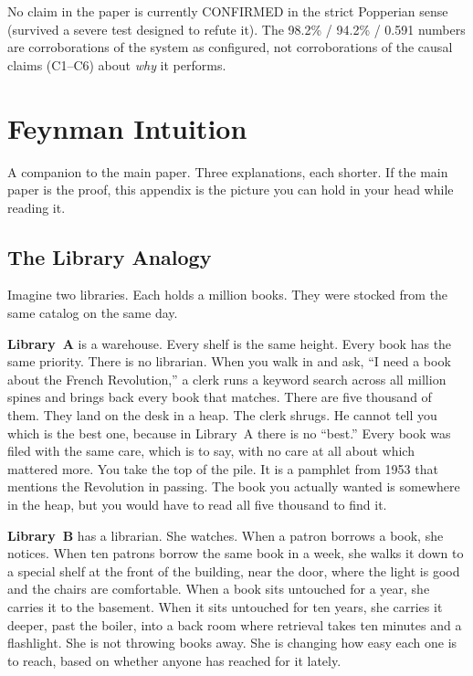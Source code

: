 \documentclass[11pt]{article}
\begin{document}
No claim in the paper is currently CONFIRMED in the strict
Popperian sense (survived a severe test designed to refute it).
The 98.2\% / 94.2\% / 0.591 numbers are corroborations of the
system as configured, not corroborations of the causal claims
(C1--C6) about \emph{why} it performs.

\section{Feynman Intuition}
\label{app:feynman}

A companion to the main paper.  Three explanations, each shorter.
If the main paper is the proof, this appendix is the picture you
can hold in your head while reading it.

\subsection{The Library Analogy}
\label{app:feynman-library}

Imagine two libraries.  Each holds a million books.  They were
stocked from the same catalog on the same day.

\textbf{Library~A} is a warehouse.  Every shelf is the same height.
Every book has the same priority.  There is no librarian.  When
you walk in and ask, ``I need a book about the French Revolution,''
a clerk runs a keyword search across all million spines and brings
back every book that matches.  There are five thousand of them.
They land on the desk in a heap.  The clerk shrugs.  He cannot
tell you which is the best one, because in Library~A there is no
``best.''  Every book was filed with the same care, which is to
say, with no care at all about which mattered more.  You take the
top of the pile.  It is a pamphlet from 1953 that mentions the
Revolution in passing.  The book you actually wanted is somewhere
in the heap, but you would have to read all five thousand to find
it.

\textbf{Library~B} has a librarian.  She watches.  When a patron
borrows a book, she notices.  When ten patrons borrow the same
book in a week, she walks it down to a special shelf at the front
of the building, near the door, where the light is good and the
chairs are comfortable.  When a book sits untouched for a year,
she carries it to the basement.  When it sits untouched for ten
years, she carries it deeper, past the boiler, into a back room
where retrieval takes ten minutes and a flashlight.  She is not
throwing books away.  She is changing how easy each one is to
reach, based on whether anyone has reached for it lately.
\end{document}
